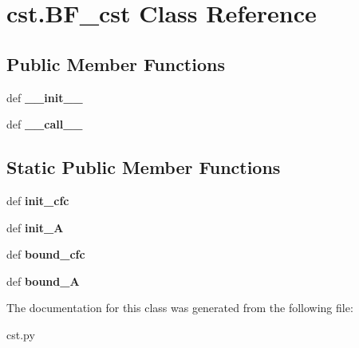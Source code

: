\hypertarget{classcst_1_1BF__cst}{\section{cst.\-B\-F\-\_\-cst \-Class \-Reference}
\label{classcst_1_1BF__cst}
}
\subsection*{\-Public \-Member \-Functions}
\begin{DoxyCompactItemize}
\item 
\hypertarget{classcst_1_1BF__cst_ab8b84510e4868e867cedae07c5e2b9e1}{def {\bfseries \-\_\-\-\_\-init\-\_\-\-\_\-}}\label{classcst_1_1BF__cst_ab8b84510e4868e867cedae07c5e2b9e1}

\item 
\hypertarget{classcst_1_1BF__cst_a8ca43a6e7a27cd85566ca627fdb91f73}{def {\bfseries \-\_\-\-\_\-call\-\_\-\-\_\-}}\label{classcst_1_1BF__cst_a8ca43a6e7a27cd85566ca627fdb91f73}

\end{DoxyCompactItemize}
\subsection*{\-Static \-Public \-Member \-Functions}
\begin{DoxyCompactItemize}
\item 
\hypertarget{classcst_1_1BF__cst_a524a2b94e57733cfae0b7aeb9ea0d94d}{def {\bfseries init\-\_\-cfc}}\label{classcst_1_1BF__cst_a524a2b94e57733cfae0b7aeb9ea0d94d}

\item 
\hypertarget{classcst_1_1BF__cst_ad18ba26bbf8cb290e7f4a12b290f46f4}{def {\bfseries init\-\_\-\-A}}\label{classcst_1_1BF__cst_ad18ba26bbf8cb290e7f4a12b290f46f4}

\item 
\hypertarget{classcst_1_1BF__cst_a55c2d1189db385093bd972cf80f40bb7}{def {\bfseries bound\-\_\-cfc}}\label{classcst_1_1BF__cst_a55c2d1189db385093bd972cf80f40bb7}

\item 
\hypertarget{classcst_1_1BF__cst_a41c0c602db45fa08f63f73d63203730c}{def {\bfseries bound\-\_\-\-A}}\label{classcst_1_1BF__cst_a41c0c602db45fa08f63f73d63203730c}

\end{DoxyCompactItemize}


\-The documentation for this class was generated from the following file\-:\begin{DoxyCompactItemize}
\item 
cst.\-py\end{DoxyCompactItemize}
